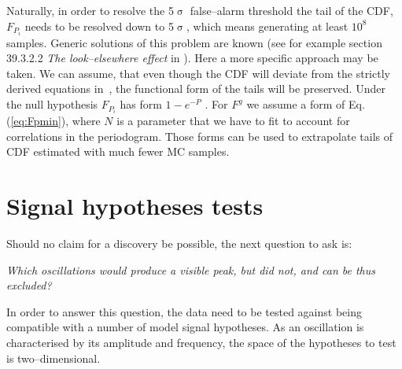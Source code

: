 Naturally, in order to resolve the 5$\upsigma$ false--alarm threshold the tail of the CDF, $F_{P_i}$ needs to be resolved down to 5$\upsigma$, which means generating at least $10^8$ samples. Generic solutions of this problem are known (see for example section 39.3.2.2 \emph{The look--elsewhere effect} in \cite{PDG2016}). Here a more specific approach may be taken. We can assume, that even though the CDF will deviate from the strictly derived equations in~\cite{Scargle1982}, the functional form of the tails will be preserved. Under the null hypothesis $F_{P_i}$ has form $1 - e^{-P}$ \cite{Scargle1982}. For $F^g$ we assume a form of Eq.\,(\ref{eq:Fpmin}), where $N$ is a parameter that we have to fit to account for correlations in the periodogram. Those forms can be used to extrapolate tails of CDF estimated with much fewer MC samples.


%





\section{Signal hypotheses tests}
Should no claim for a discovery be possible, the next question to ask is:
\begin{center}
  \emph{Which oscillations would produce a visible peak, but did not, and can be thus excluded?}
\end{center}
In order to answer this question, the data need to be tested against being compatible with a number of model signal hypotheses. As an oscillation is characterised by its amplitude and frequency, the space of the hypotheses to test is two--dimensional.


